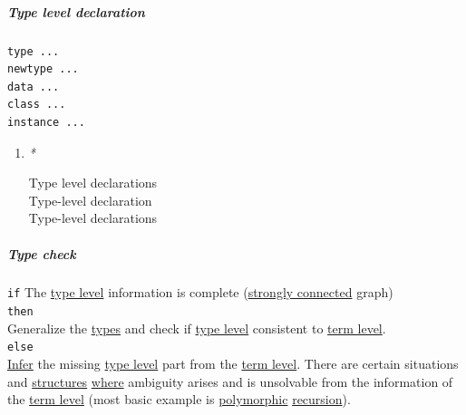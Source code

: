 \documentclass[11pt]{article}
\begin{document}
\subparagraph{\label{orga7c5019}Type level declaration}
\label{sec:org4807be1}
\begin{verbatim}
type ...
newtype ...
data ...
class ...
instance ...
\end{verbatim}

\begin{enumerate}
\item \emph{*}
\label{sec:org1eeaa91}

\label{org041b6df}Type level declarations\\
\label{org66a42d5}Type-level declaration\\
\label{orgfc6c0b5}Type-level declarations\\
\end{enumerate}


\subparagraph{\label{org4fdea01}Type check}
\label{sec:org9890035}
\texttt{if} The \hyperref[org01e5da3]{type level} information is complete (\hyperref[orgc84d9f9]{strongly connected} graph)\\

\texttt{then}\\

Generalize the \hyperref[org3927fd9]{types} and check if \hyperref[org01e5da3]{type level} consistent to \hyperref[org3e856cf]{term level}.\\

\texttt{else}\\

\hyperref[org774bd97]{Infer} the missing \hyperref[org01e5da3]{type level} part from the \hyperref[org3e856cf]{term level}. There are certain situations and \hyperref[org51d1eff]{structures} \hyperref[orgefd1ecd]{where} ambiguity arises and is unsolvable from the information of the \hyperref[org3e856cf]{term level} (most basic example is \hyperref[org84d7fee]{polymorphic} \hyperref[orgc27dbaf]{recursion}).\\
\end{document}
